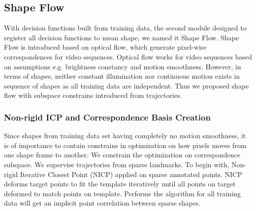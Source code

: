 

\subsection{Shape Flow}

With decision functions built from training data, the second module designed to register all decision functions to mean shape, we named it Shape Flow. Shape Flow is introduced based on optical flow, which generate pixel-wise correspondences for video sequences. Optical flow works for video sequences based on assumptions e.g. brightness constancy and motion smoothness. However, in terms of shapes, neither constant illumination nor continuous motion exists in sequence of shapes as all training data are independent. Thus we proposed shape flow with subspace constrains introduced from trajectories.

\subsubsection{Non-rigid ICP and Correspondence Basis Creation} \label{sec:trabasis}
Since shapes from training data set having completely no motion smoothness, it is of importance to contain constrains in optimization on how pixels moves from one shape frame to another. We constrain the optimization on correspondence subspace.
We supervise trajectories from sparse landmarks. To begin with, Non-rigid Iterative Closest Point (NICP)\cite{?} applied on sparse annotated points. NICP deforms target points to fit the template iteratively until all points on target deformed to match points on template. Performs the algorithm for all training data will get an implicit point correlation between sparse shapes.

